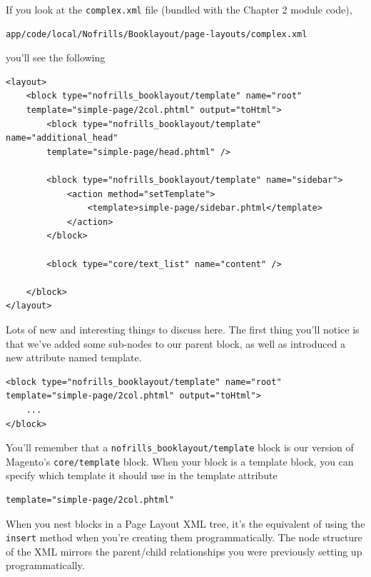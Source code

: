 \documentclass[oneside]{book}
\begin{document}
If you look at the \footnotesize\texttt{complex.xml} \normalsize  file (bundled with the Chapter 2 module code), 

\begin{lstlisting}
app/code/local/Nofrills/Booklayout/page-layouts/complex.xml

\end{lstlisting}


you'll see the following 

\begin{lstlisting}
<layout>            
    <block type="nofrills_booklayout/template" name="root"
    template="simple-page/2col.phtml" output="toHtml">
        <block type="nofrills_booklayout/template" name="additional_head"
        template="simple-page/head.phtml" />

        <block type="nofrills_booklayout/template" name="sidebar">
            <action method="setTemplate">
                <template>simple-page/sidebar.phtml</template>
            </action>
        </block>

        <block type="core/text_list" name="content" />

    </block>
</layout>

\end{lstlisting}


Lots of new and interesting things to discuss here.  The first thing you'll notice is that we've added some sub-nodes to our parent block, as well as introduced a new attribute named template.    

\begin{lstlisting}
<block type="nofrills_booklayout/template" name="root"
template="simple-page/2col.phtml" output="toHtml">
    ...
</block>

\end{lstlisting}


You'll remember that a \footnotesize\texttt{nofrills\_booklayout/template} \normalsize  block is our version of Magento's \footnotesize\texttt{core/template} \normalsize  block.  When your block is a template block, you can specify which template it should use in the template attribute

\begin{lstlisting}
template="simple-page/2col.phtml"

\end{lstlisting}


When you nest blocks in a Page Layout XML tree, it's the equivalent of using the \footnotesize\texttt{insert} \normalsize  method when you're creating them programmatically.  The node structure of the XML mirrors the parent/child relationships you were previously setting up programmatically.  
\end{document}
